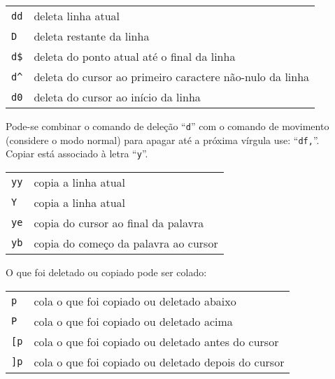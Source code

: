 \begin{table}[htb]\begin{center} \begin{tabular}{ll} \hline
 \verb|dd| & deleta linha atual \\
 \verb|D|  & deleta restante da linha \\
 \verb|d$| & deleta do ponto atual até o final da linha \\
 \verb|d^| & deleta do cursor ao primeiro caractere não-nulo da linha \\
 \verb|d0| & deleta do cursor ao início da linha \\
\hline \end{tabular}\end{center}\end{table}

{\Large {}} Pode-se combinar o comando de deleção ``\verb+d+'' com o
comando de movimento (considere o modo normal) para apagar até a
próxima vírgula use: ``\verb+df,+''. \\

Copiar está associado à letra ``\verb|y|''.

\begin{table}[htb]\begin{center} \begin{tabular}{ll} \hline
     \verb|yy| & copia a linha atual \\
     \verb|Y| & copia a linha atual \\
     \verb|ye| & copia do cursor ao final da palavra \\
     \verb|yb| & copia do começo da palavra ao cursor \\
\hline \end{tabular}\end{center}\end{table}


O que foi deletado ou copiado pode ser colado:
\begin{table}[htb]\begin{center} \begin{tabular}{ll} \hline
     \verb|p| & cola o que foi copiado ou deletado abaixo \\
     \verb|P| & cola o que foi copiado ou deletado acima  \\
     \verb|[p| & cola o que foi copiado ou deletado antes do cursor \\
     \verb|]p| & cola o que foi copiado ou deletado depois do cursor \\ 
\hline \end{tabular}\end{center}\end{table}


